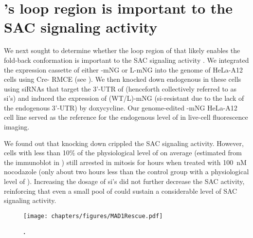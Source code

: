 \section{'s loop region is important to the SAC signaling activity }
\label{LoopDeletionSection}

We next sought to determine whether the loop region of  that likely enables the fold-back conformation is important to the SAC signaling activity . We integrated the expression cassette of either -mNG or \textDelta{}L-mNG into the genome of HeLa-A12 cells using Cre- RMCE (see ). We then knocked down endogenous  in these cells using siRNAs that target the 3'-UTR of  \cite{siMAD1-3UTR} (henceforth collectively referred to as si's) and induced the expression of (WT/\textDelta{}L)-mNG (si-resistant due to the lack of the endogenous 3'-UTR) by doxycycline. Our genome-edited -mNG HeLa-A12 cell line served as the reference for the endogenous level of  in live-cell fluorescence imaging.

We found out that knocking down  crippled the SAC signaling activity. However, cells with less than 10\% of the physiological level of  on average (estimated from the immunoblot in ) still arrested in mitosis for hours when treated with \SI{100}{nM} nocodazole (only about two hours less than the control group with a physiological level of ). Increasing the dosage of si's did not further decrease the SAC activity, reinforcing that even a small pool of  could sustain a considerable level of SAC signaling activity.




\begin{figure}
    \centering
    \texttt{[image: chapters/figures/MAD1Rescue.pdf]}
    \caption{\textbf{.}}
    \noindent\justifying 
    \label{MAD1Rescue}
\end{figure}



